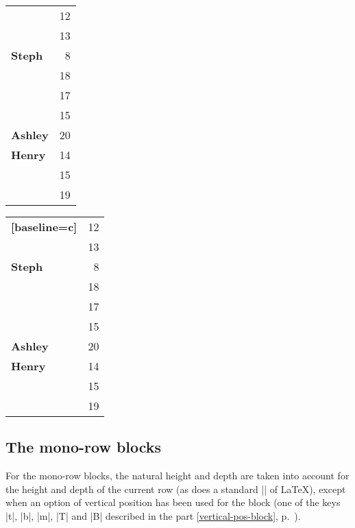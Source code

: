 \documentclass[dvipsnames]{article}%
\begin{document}
\bigskip
\begin{scope}
\hfuzz=10cm
\begin{Code}[width=12cm]
\begin{NiceTabular}{@{}>{\bfseries}lr@{}} \hline
{}    & 12 \\
                     & 13 \\ \hline
Steph                &  8 \\ \hline
{}   & 18 \\
                     & 17 \\
                     & 15 \\ \hline
Ashley               & 20 \\ \hline
Henry                & 14 \\ \hline
{} & 15 \\
                     & 19 \\ \hline
\end{NiceTabular}
\end{Code}
\begin{NiceTabular}{@{}>{\bfseries}lr@{}}[baseline=c] \hline
{}    & 12 \\
                     & 13 \\ \hline
Steph                &  8 \\ \hline
{}   & 18 \\
                     & 17 \\
                     & 15 \\ \hline
Ashley               & 20 \\ \hline
Henry                & 14 \\ \hline
{} & 15 \\
                     & 19 \\ \hline
\end{NiceTabular}
\end{scope}


\subsection{The mono-row blocks}

For the mono-row blocks, the natural height and depth are taken into account
for the height and depth of the current row (as does a standard |\multicolumn|
of LaTeX), except when an option of vertical position has been used for the block
(one of the keys |t|, |b|, |m|, |T| and |B| described in the part
\ref{vertical-pos-block}, p.~\pageref{vertical-pos-block}).
\end{document}
